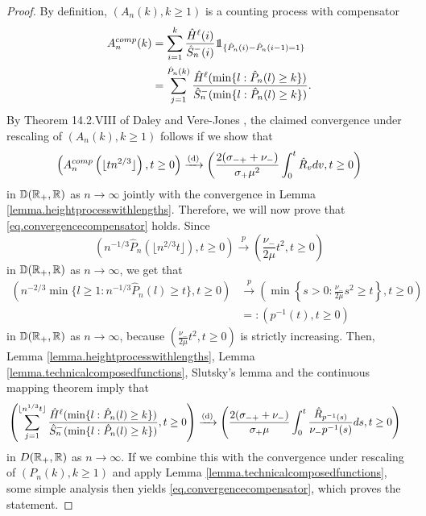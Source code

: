 \begin{proof}
By definition, $(A_n(k),k\geq 1)$ is a counting process with compensator 
\begin{align*}
    A_n^{comp}(k)&=\sum_{i=1}^k \frac{\hat{H}^\ell(i)}{\hat{S}^-_n(i)}\one_{\{\hat{P}_n(i)-\hat{P}_n(i-1)=1\}}\\
    &=\sum_{j=1}^{\hat{P}_n(k)}\frac{\hat{H}^\ell(\min\{l:\hat{P}_n(l)\geq k\})}{\hat{S}^-_n(\min\{l:\hat{P}_n(l)\geq k\})}.
\end{align*}
 By Theorem 14.2.VIII of Daley and Vere-Jones \cite{daleyIntroductionTheoryPoint2008}, the claimed convergence under rescaling of $(A_n(k),k\geq 1)$ follows if we show that 
\begin{equation}\label{eq.convergencecompensator}
    \left(A_n^{comp}\left(\lfloor tn^{2/3}\rfloor \right), t\geq 0\right)\xrightarrow[]{\mathrm{(d)}}\left(\frac{2(\sigma_{-+}+\nu_-)}{\sigma_+\mu^2} \int_0^t\hat{R}_v dv, t \geq 0\right)
\end{equation}
in ${\mathbb D}({\mathbb R}_+,{\mathbb R})$ as $n\to \infty$ jointly with the convergence in Lemma \ref{lemma.heightprocesswithlengths}. Therefore, we will now prove that \eqref{eq.convergencecompensator} holds. Since
$$\left(n^{-1/3}\hat{P}_n\left(\lfloor n^{2/3}t\rfloor \right),t\geq 0\right)\overset{p}{\to}\left(\frac{\nu_-}{2\mu}t^2,t\geq 0\right)$$
in ${\mathbb D}({\mathbb R}_+,{\mathbb R})$ as $n\to \infty$,
we get that
\begin{align*}\left(n^{-2/3}\min\{l\geq 1:n^{-1/3}\hat{P}_n(l)\geq t\},t\geq 0\right)&\overset{p}{\to}\left(\min\left\{s>0: \frac{\nu_-}{2\mu}s^2\geq t\right \}, t\geq 0\right)\\
&=:\left(p^{-1}(t),t\geq 0\right) \end{align*}
in ${\mathbb D}({\mathbb R}_+,{\mathbb R})$ as $n\to \infty$, because $\left(\frac{\nu_-}{2\mu}t^2,t\geq 0\right)$ is strictly increasing. Then, Lemma \ref{lemma.heightprocesswithlengths}, Lemma \ref{lemma.technicalcomposedfunctions}, Slutsky's lemma and the continuous mapping theorem imply that 
\begin{align*}&\left(\sum_{j=1}^{\lfloor n^{1/3}t\rfloor}\frac{\hat{H}^\ell(\min\{l:\hat{P}_n(l)\geq k\})}{\hat{S}^-_n(\min\{l:\hat{P}_n(l)\geq k\})},t\geq 0\right)\xrightarrow[]{\mathrm{(d)}} \left( \frac{2(\sigma_{-+}+\nu_-)}{\sigma_+\mu} \int_0^t \frac{\hat{R}_{p^{-1}(s)}}{\nu_- p^{-1}(s)}ds,t\geq 0 \right)
\end{align*}
in $D({\mathbb R}_+,{\mathbb R})$ as $n\to\infty$. If we combine this with the convergence under rescaling of $(P_n(k),k\geq 1)$ and apply Lemma \ref{lemma.technicalcomposedfunctions}, some simple analysis then yields \eqref{eq.convergencecompensator}, which proves the statement.
\end{proof}

